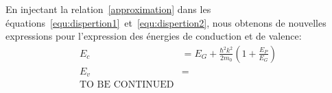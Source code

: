 \documentclass[a4paper,12pt]{article}
\begin{document}
En injectant la relation~\ref{approximation} dans les équations~\ref{equ:dispertion1}~et~\ref{equ:dispertion2}, nous obtenons de nouvelles expressions pour l'expression des énergies de conduction et de valence:
\begin{align}\label{equ:bande-intermédiaire1}
  E_c  &= E_G + \frac{\hbar^2 k^2}{2 m_0} \left(1+\frac{E_P}{E_G}\right) \\\label{equ:bande-intermédiaire2}
  E_v  &= \\ \mbox{TO BE CONTINUED}
\end{align}



  
\end{document}
